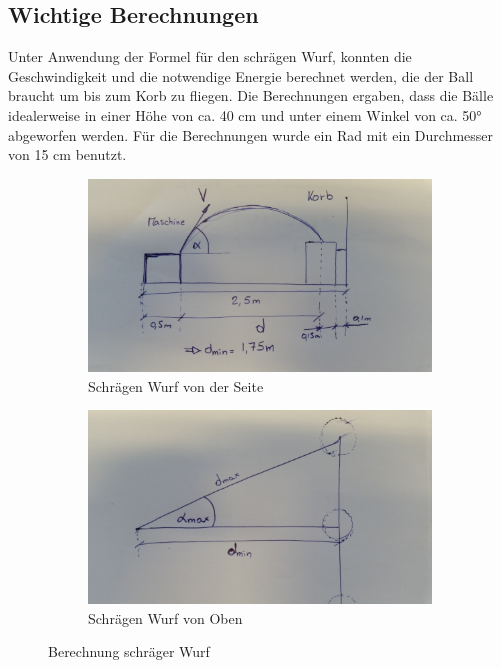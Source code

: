 \subsection{Wichtige Berechnungen}\label{sec:berechnungen}
Unter Anwendung der Formel für den schrägen Wurf, konnten die Geschwindigkeit und die notwendige Energie berechnet werden, 
die der Ball braucht um bis zum Korb zu fliegen. Die Berechnungen ergaben, dass die Bälle idealerweise in einer Höhe von ca. 40 cm und unter einem Winkel von ca. 50° abgeworfen werden. Für die Berechnungen wurde ein Rad mit ein Durchmesser von 15 cm benutzt. \\

\begin{figure}[h!]
	\begin{subfigure}{.5\textwidth}
		\includegraphics[width=1\textwidth]{../../fig/Skizze_Berechnung_1.jpg}
		\caption{Schrägen Wurf von der Seite}
		\label{fig:Berechnungen von die Geschwindigkeit}
	\end{subfigure} %
	\begin{subfigure}{.5\textwidth}
		\includegraphics[width=1\textwidth]{../../fig/Skizze_Berechnung_2.jpg}
		\caption{Schrägen Wurf von Oben}
		\label{fig:Berechnungen von die Geschwindigkeit}
	\end{subfigure}
	\caption{Berechnung schräger Wurf}
	\label{Berechnungen}
\end{figure}

